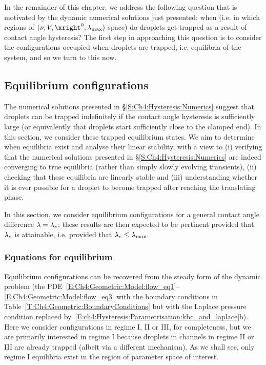 In the remainder of this chapter, we address the following question that is motivated by the dynamic numerical solutions just presented: when (i.e. in which regions of $(\nu, V, \xright^0, \hysparmax)$ space) do droplets get trapped as a result of contact angle hysteresis? The first step in approaching this question is to consider the configurations occupied when droplets are trapped, i.e. equilibria of the system, and so we turn to this now.
\subsection{Equilibrium configurations}\label{S:Ch4:Hysteresis:Equilibria}
The numerical solutions presented in \S\ref{S:Ch4:Hysteresis:Numerics} suggest that droplets can be trapped indefinitely if the contact angle hysteresis is sufficiently large (or equivalently that droplets start sufficiently close to the clamped end). In this section, we consider these trapped equilibrium states. We aim to determine when equilibria exist and analyse their linear stability, with a view to (i) verifying that the numerical solutions presented in \S\ref{S:Ch4:Hysteresis:Numerics} are indeed converging to true equilibria (rather than simply slowly evolving transients), (ii) checking that these equilibria are linearly stable and (iii) understanding whether it is ever possible for a droplet to become trapped after reaching the translating phase.

In this section, we consider equilibrium configurations for a general contact angle difference $\lambda = \lambda_e$; these results are then expected to be pertinent provided that $\lambda_e$ is attainable, i.e. provided that $\lambda_e \leq \lambda_{\text{max}}$.

\subsubsection{Equations for equilibrium}
Equilibrium configurations can be recovered from the steady form of the dynamic problem (the PDE~\eqref{E:Ch4:Geometric:Model:flow_eq1}--\eqref{E:Ch4:Geometric:Model:flow_eq3} with the boundary conditions in Table~\ref{T:Ch4:Geometric:BoundaryConditions} but with the Laplace pressure condition replaced by~\eqref{E:ch4:Hysteresis:Parametrisation:kbc_and_laplace}b). Here we consider configurations in regime I, II or III, for completeness, but we are primarily interested in regime I because droplets in channels in regime II or III are already trapped (albeit via a different mechanism). As we shall see, only regime I equilibria exist in the region of parameter space of interest.

